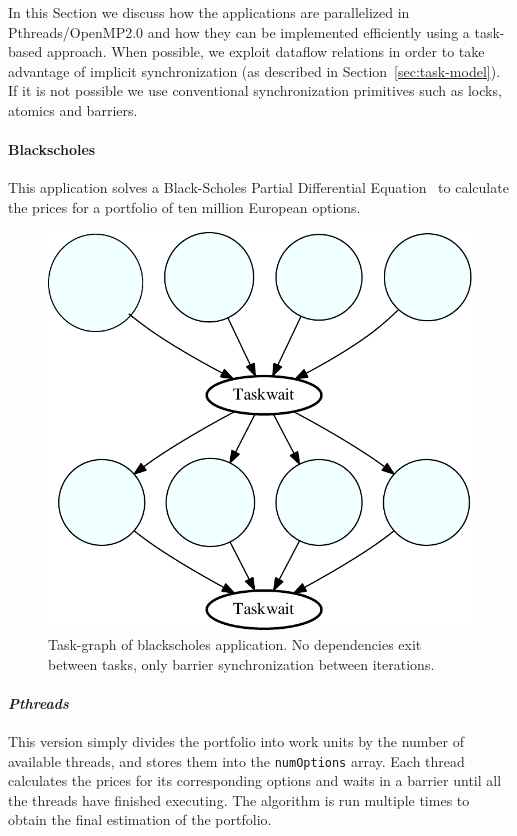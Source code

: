In this Section we discuss how the \PARSEC{} applications are parallelized in Pthreads/OpenMP2.0 and how they can be implemented efficiently 
using a task-based approach.  When possible, we exploit dataflow relations in order to take advantage of implicit synchronization 
(as described in Section~\ref{sec:task-model}). If it is not possible we use conventional synchronization primitives such as locks,
atomics and barriers.

\paragraph{\textbf{Blackscholes}}
This application solves a Black-Scholes Partial Differential Equation~\cite{RePEc:ucp:jpolec:v:81:y:1973:i:3:p:637-54} to calculate the
prices for a portfolio of ten million European options.

\begin{figure}[t!]%
	\center
	\includegraphics[width=0.5\columnwidth]{ifcg/figures/blackscholes_taskgraph}%
	\caption{Task-graph of blackscholes application.  No dependencies exit between tasks,
only barrier synchronization between iterations.}
	\label{fig:blackscholes_tg}%
	\vspace{.5cm}
\end{figure}

\paragraph{\textit{Pthreads}} This version simply divides the portfolio into
work units by the number of available threads, and stores them into the
\texttt{numOptions} array. Each thread calculates the prices for its
corresponding options and waits in a barrier until all the threads have
finished executing. The algorithm is run multiple times to obtain the final
estimation of the portfolio.


